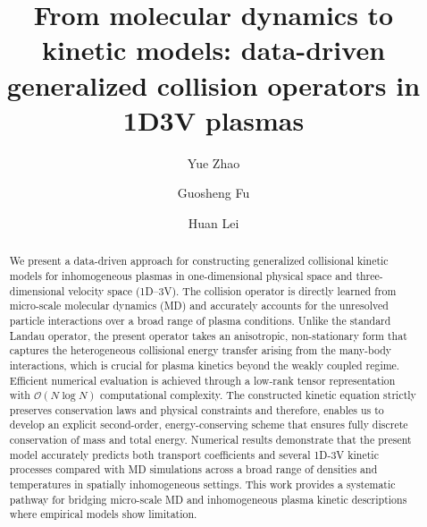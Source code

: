 \documentclass[preprint,1p,times]{elsarticle}
\newcommand{\cO}{\mathcal{O}}
\theoremstyle{definition}
\theoremstyle{remark}
\begin{document}
\begin{frontmatter}


\title{From molecular dynamics to kinetic models: data-driven generalized collision operators in 1D3V plasmas} %
\author[1]{Yue Zhao}
\address[1]{{Department of Computational Mathematics, Science \& Engineering, Michigan State University}, 428 S Shaw Ln, East Lansing 48824, MI, USA}
\author[3]{Guosheng Fu}
\address[3]{{Department of Applied and Computational Mathematics and Statistics (ACMS), University of Notre Dame}, Notre Dame 46556, IN, USA}
\author[1,2]{Huan Lei}
\address[2]{{Department of Statistics \& Probability, Michigan State University}, 619 Red Cedar Road Wells Hall, East Lansing 48824, MI, USA}



\begin{abstract}
%
We present a data-driven approach for constructing generalized collisional kinetic models for inhomogeneous plasmas in one-dimensional physical space and three-dimensional velocity space (1D–3V). The collision operator is directly learned from micro-scale molecular dynamics (MD)
and accurately accounts for the unresolved particle interactions over a broad range of plasma conditions. Unlike the standard Landau operator, the present operator takes an anisotropic, non-stationary form that captures the heterogeneous collisional energy transfer arising from the many-body interactions, which is crucial for plasma kinetics beyond the weakly coupled regime.  Efficient numerical evaluation is achieved through a low-rank tensor representation with $\cO(N \log N)$ computational complexity. The constructed kinetic equation strictly preserves conservation laws and physical constraints and therefore, enables us to develop an explicit second-order, energy-conserving scheme that ensures fully discrete conservation of mass and total energy. Numerical results demonstrate that the present model accurately predicts both transport coefficients and several 1D-3V kinetic processes compared with MD simulations across a broad range of densities and temperatures in spatially inhomogeneous settings.  This work provides a systematic pathway for bridging micro-scale MD and inhomogeneous plasma kinetic descriptions where empirical models show limitation. 



\end{abstract}
\end{frontmatter}
\end{document}
